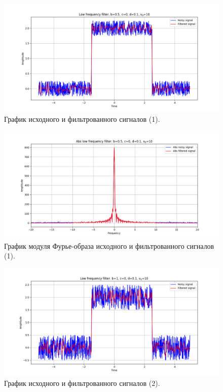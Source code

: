 \documentclass[a4paper, 12pt]{article}
\begin{document}
    \begin{figure}[!htb]
        \centering
        \includegraphics[scale=0.48]{1_u_flt_u_nohigh.png}
        \captionsetup{skip=0pt}
        \caption{График исходного и фильтрованного сигналов (1).}
        \label{fig:fig1}
    \end{figure}
    \begin{figure}[!htb]
        \centering
        \includegraphics[scale=0.48]{1_abs_u_U_nohigh.png}
        \captionsetup{skip=0pt}
        \caption{График модуля Фурье-образа исходного и фильтрованного сигналов (1).}
        \label{fig:fig2}
    \end{figure}
    \begin{figure}[!htb]
        \centering
        \includegraphics[scale=0.48]{2_u_flt_u_nohigh.png}
        \captionsetup{skip=0pt}
        \caption{График исходного и фильтрованного сигналов (2).}
        \label{fig:fig3}
    \end{figure}
\end{document}
